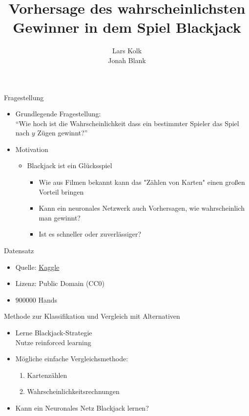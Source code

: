 \documentclass[aspectratio=1610, 9pt]{beamer}
\title{Vorhersage des wahrscheinlichsten Gewinner in dem Spiel Blackjack}
\author[L.~Kolk,~J.~Blank]{Lars Kolk\\ Jonah Blank}
\institute[ML-Seminar]{\\[0.3cm]TU Dortmund \\ \Large ML-Seminar}
\begin{document}
\maketitle


\begin{frame}{Fragestellung}
\begin{itemize}
  \item Grundlegende Fragestellung:\\
  \rightarrow{} ``Wie hoch ist die Wahrscheinlichkeit dass ein bestimmter Spieler das Spiel nach $y$ Zügen gewinnt?''
  \vspace{0.5cm}
  \item Motivation
  \begin{itemize}
    \item Blackjack ist ein Glücksspiel
    \begin{itemize}
      \item Wie aus Filmen bekannt kann das "Zählen von Karten" einen großen Vorteil bringen
      \item Kann ein neuronales Netzwerk auch Vorhersagen, wie wahrscheinlich man gewinnt?
      \item Ist es schneller oder zuverlässiger?
    \end{itemize}
  \end{itemize}
\end{itemize}
\end{frame}


\begin{frame}{Datensatz}
    \begin{itemize}
    \item Quelle: \href{https://www.kaggle.com/mojocolors/900000-hands-of-blackjack-results}{Kaggle}
    \item Lizenz: Public Domain (CC0)
    \item $900000$ Hands
    \end{itemize}
\end{frame}

\begin{frame}{Methode zur Klassifikation und Vergleich mit Alternativen}
  \begin{itemize}
    \item Lerne Blackjack-Strategie \\
    \rightarrow{} Nutze reinforced learning\\
    \item Mögliche einfache Vergleichsmethode:
    \begin{enumerate}
      \item Kartenzählen
      \item Wahrscheinlichkeitsrechnungen
    \end{enumerate}
    \item Kann ein Neuronales Netz Blackjack lernen?
  \end{itemize}
\end{frame}
\end{document}

